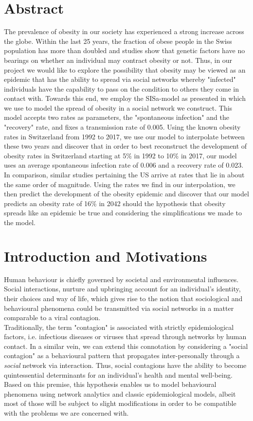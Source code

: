 \documentclass[11pt]{article}
\begin{document}
\section{Abstract}
The prevalence of obesity in our society has experienced a strong increase across the globe. Within the last 25 years, the fraction of obese people in the Swiss population has more than doubled\cite{spreadOfObesityPaper} and studies show that genetic factors have no bearings on whether an individual may contract obesity or not\cite{infectiousDiseaseModeling}. Thus, in our project we would like to explore the possibility that obesity may be viewed as an epidemic that has the ability to spread via social networks whereby "infected" individuals have the capability to pass on the condition to others they come in contact with. Towards this end, we employ the SISa-model as presented in \cite{infectiousDiseaseModeling} which we use to model the spread of obesity in a social network we construct. This model accepts two rates as parameters, the "spontaneous infection" and the "recovery" rate, and fixes a transmission rate of 0.005. Using the known obesity rates in Switzerland from 1992 to 2017, we use our model to interpolate between these two years and discover that in order to best reconstruct the development of obesity rates in Switzerland starting at 5\% in 1992 to 10\% in 2017, our model uses an average spontaneous infection rate of 0.006 and a recovery rate of 0.023. In comparison, similar studies pertaining the US arrive at rates that lie in about the same order of magnitude. Using the rates we find in our interpolation, we then predict the development of the obesity epidemic and discover that our model predicts an obesity rate of 16\% in 2042 should the hypothesis that obesity spreads like an epidemic be true and considering the simplifications we made to the model. 
\section{Introduction and Motivations}
Human behaviour is chiefly governed by societal and environmental influences. Social interactions, nurture and upbringing account for an individual’s identity, their choices and way of life, which gives rise to the notion that sociological and behavioural phenomena could be transmitted via social networks in a matter comparable to a viral contagion.\\

Traditionally, the term "contagion" is associated with strictly epidemiological factors, i.e. infectious diseases or viruses that spread through networks by human contact. In a similar vein, we can extend this connotation by considering a "social contagion" as a behavioural pattern that propagates inter-personally through a \textit{social} network via interaction. Thus, social contagions have the ability to become quintessential determinants for an individual’s health and mental well-being. Based on this premise, this hypothesis enables us to model behavioural phenomena using network analytics and classic epidemiological models, albeit most of those will be subject to slight modifications in order to be compatible with the problems we are concerned with.\\
\end{document}
